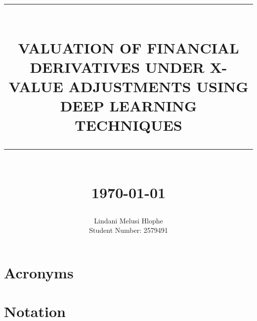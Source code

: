 \documentclass[11   pt]{report}
\newcommand{\HRule}[1]{\rule{\linewidth}{#1}}
\begin{document}
{\selectfont
\title{ 
    \normalsize \textsc{}
    \\ [1.0cm]
    \HRule{0.5pt} \\
    \centering
    \large \textbf{\uppercase{Valuation of Financial Derivatives under X-Value Adjustments using Deep Learning Techniques}} \\  %
    \HRule{0.5pt} \\ [0.3cm]
    \normalsize \today \\
    \vspace*{2\baselineskip}
}

\date{}

\author{
		Lindani Melusi Hlophe \\ 
		Student Number: 2579491\\}

\maketitle
\begin{abstract}
\end{abstract}

\newpage

\listoffigures
{}

\newpage
\listoftables
{}

\newpage
\chapter*{Acronyms}

\newpage
\chapter*{Notation}


\tableofcontents
\newpage

\sectionfont{\scshape}

    
}
\end{document}
